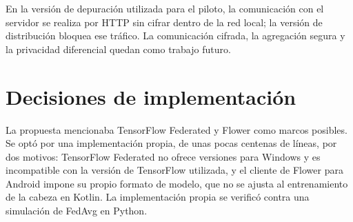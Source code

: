 En la versión de depuración utilizada para el piloto, la comunicación con el servidor se realiza por HTTP sin cifrar dentro de la red local; la versión de distribución bloquea ese tráfico. La comunicación cifrada, la agregación segura y la privacidad diferencial quedan como trabajo futuro.

\section{Decisiones de implementación}

La propuesta mencionaba TensorFlow Federated y Flower como marcos posibles. Se optó por una implementación propia, de unas pocas centenas de líneas, por dos motivos: TensorFlow Federated no ofrece versiones para Windows y es incompatible con la versión de TensorFlow utilizada, y el cliente de Flower para Android impone su propio formato de modelo, que no se ajusta al entrenamiento de la cabeza en Kotlin. La implementación propia se verificó contra una simulación de FedAvg en Python.
